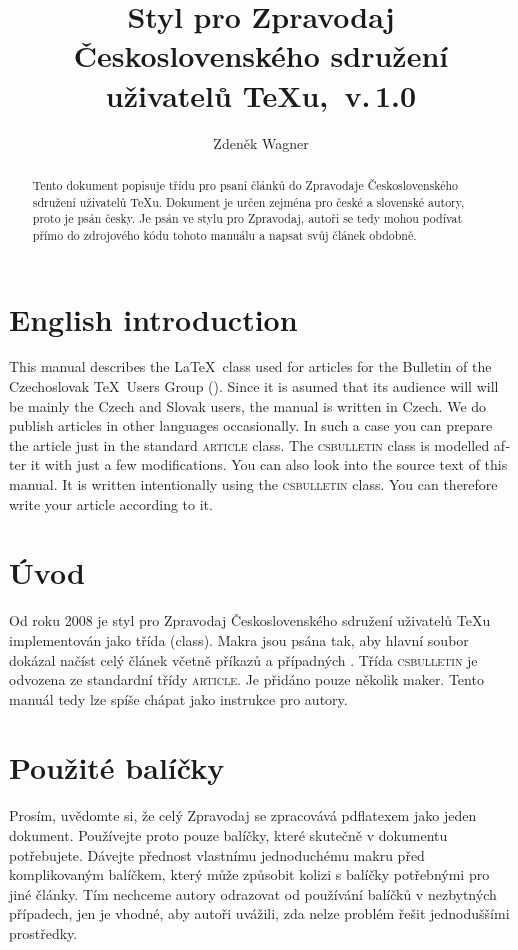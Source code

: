 \documentclass{csbulletin}
\DeclareRobustCommand\version{\unskip~v.\,1.0}
\let\pkg\textsc
\begin{document}
\title{Styl pro Zpravodaj Československého sdružení uživatelů \TeX{}u,\version}
\EnglishTitle{\LaTeX\ Class for \CSTUG\ Bulletin,\version}
\author{Zdeněk Wagner}
\maketitle

\begin{abstract}
Tento dokument popisuje třídu pro psaní článků do Zpravodaje Československého sdružení uživatelů
\TeX{}u. Dokument je určen zejména pro české a slovenské autory, proto je psán česky. Je psán 
ve stylu pro Zpravodaj, autoři se tedy mohou podívat přímo do zdrojového kódu tohoto manuálu a
napsat svůj článek obdobně.
\end{abstract}

\section{English introduction}
\begin{otherlanguage}{english}
This manual describes the \LaTeX\ class used for articles for the Bulletin of the Czechoslovak
\TeX\ Users Group (\cstug). Since it is asumed that its audience will will be mainly the Czech and
Slovak users, the manual is written in Czech. We do publish articles in other languages
occasionally. In such a case you can prepare the article just in the standard \pkg{article} class.
The \pkg{csbulletin} class is modelled after it with just a few modifications. You can also look
into the source text of this manual. It is written intentionally using the \pkg{csbulletin} class.
You can therefore write your article according to it.
\end{otherlanguage}

\section{Úvod}
Od roku 2008 je styl pro Zpravodaj Československého sdružení uživatelů \TeX{}u implementován jako
třída (class). Makra jsou psána tak, aby hlavní soubor dokázal načíst celý článek včetně příkazů
 a případných . Třída \pkg{csbulletin} je odvozena ze standardní
třídy \pkg{article}. Je přidáno pouze několik maker. Tento manuál tedy lze spíše chápat jako
instrukce pro autory.

\section{Použité balíčky}
Prosím, uvědomte si, že celý Zpravodaj se zpracovává pdflatexem jako jeden dokument. Používejte
proto pouze balíčky, které skutečně v dokumentu potřebujete. Dávejte přednost vlastnímu
jednoduchému makru před komplikovaným balíčkem, který může způsobit kolizi s balíčky potřebnými pro
jiné články. Tím nechceme autory odrazovat od používání balíčků v nezbytných případech, jen je
vhodné, aby autoři uvážili, zda nelze problém řešit jednoduššími prostředky.
\end{document}
